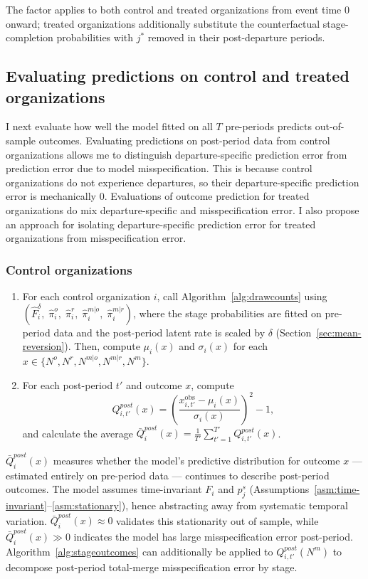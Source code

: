 \documentclass[source/paper/main.tex]{subfiles}
\begin{document}
The factor applies to both control and treated organizations from event time $0$ onward; treated organizations additionally substitute the counterfactual stage-completion probabilities with $j^*$ removed in their post-departure periods.

\subsection{Evaluating predictions on control and treated organizations}

I next evaluate how well the model fitted on all $T$ pre-periods predicts out-of-sample outcomes.
Evaluating predictions on post-period data from control organizations allows me to distinguish departure-specific prediction error from prediction error due to model misspecification.
This is because control organizations do not experience departures, so their departure-specific prediction error is mechanically 0.
Evaluations of outcome prediction for treated organizations do mix departure-specific and misspecification error.
I also propose an approach for isolating departure-specific prediction error for treated organizations from misspecification error.

\subsubsection{Control organizations}

\begin{enumerate}
    \item For each control organization $i$, call Algorithm~\ref{alg:drawcounts} using $(\hat{F}_i^{\delta},\;\hat{\pi}_i^o,\;\hat{\pi}_i^r,\;\hat{\pi}_i^{m|o},\;\hat{\pi}_i^{m|r})$, where the stage probabilities are fitted on pre-period data and the post-period latent rate is scaled by $\delta$ (Section~\ref{sec:mean-reversion}). Then, compute $\mu_i(x)$ and $\sigma_i(x)$ for each $x \in \{N^o, N^r, N^{m|o}, N^{m|r}, N^m\}$.
    \item For each post-period $t'$ and outcome $x$, compute
    $$Q_{i,t'}^{post}(x) = \left(\frac{x_{i,t'}^{\mathrm{obs}} - \mu_i(x)}{\sigma_i(x)}\right)^2 - 1,$$ and calculate the average $\bar{Q}_i^{post}(x) = \frac{1}{T'}\sum_{t'=1}^{T'} Q_{i,t'}^{post}(x)$.
\end{enumerate}
$\bar{Q}_i^{post}(x)$ measures whether the model's predictive distribution for outcome $x$ --- estimated entirely on pre-period data --- continues to describe post-period outcomes.
The model assumes time-invariant $F_i$ and $p_j^s$ (Assumptions~\ref{asm:time-invariant}--\ref{asm:stationary}), hence abstracting away from systematic temporal variation.
$\bar{Q}_i^{post}(x) \approx 0$ validates this stationarity out of sample, while $\bar{Q}_i^{post}(x) \gg 0$ indicates the model has large misspecification error post-period.
Algorithm~\ref{alg:stageoutcomes} can additionally be applied to $Q_{i,t'}^{post}(N^m)$ to decompose post-period total-merge misspecification error by stage.
\end{document}
